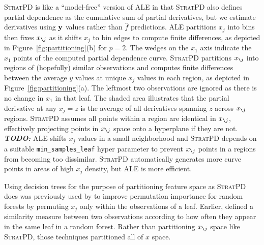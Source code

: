 \documentclass{article}
\newcommand{\figref}[1]{Figure~\ref{#1}}
\newcommand{\cut}[1]{}
\newcommand{\todo}[1]{{\bf\em TODO:} {{\color{red}{#1}}}}
\newcommand{\spd}{\fontfamily{cmr}\textsc{\small StratPD}}
\newcommand{\xnj}{$x_{\texttt{\char`\\} j}$}
\renewcommand{\slash}{\texttt{\char`\\}}
\DeclareMathOperator{\Ex}{\mathbb{E}}
\begin{document}
\spd{} is like a ``model-free'' version of ALE in that \spd{} also defines partial dependence as the cumulative sum of partial derivatives, but we estimate derivatives using $\bf y$ values rather than $\hat{f}$ predictions. 
ALE partitions $x_j$ into bins then fixes \xnj{} as it shifts $x_j$ to bin edges to compute finite differences, as depicted in \figref{fig:partitioning}(b) for $p=2$. The wedges on the $x_1$ axis indicate the $x_1$ points of the computed partial dependence curve.  \spd{} partitions \xnj{} into regions of (hopefully) similar observations and computes finite differences between the average $y$ values at unique $x_j$ values in each region, as depicted in \figref{fig:partitioning}(a).  The leftmost two observations are ignored as there is no change in $x_1$ in that leaf. The shaded area illustrates that the partial derivative at any $x_j=z$ is the average of all derivatives spanning $z$ across \xnj{} regions.  \spd{} assumes all points within a region are identical in \xnj{}, effectively projecting points in \xnj{} space onto a hyperplane if they are not. \todo{sound right James?}  ALE shifts $x_j$ values in a small neighborhood and \spd{} depends on a suitable {\tt\small min\_samples\_leaf}  hyper parameter to prevent \xnj{} points in a regions from becoming too dissimilar.  \spd{} automatically generates more curve points in areas of high $x_j$ density, but ALE is more efficient.

Using decision trees for the purpose of partitioning feature space as \spd{} does was previously used by \cite{rfimp} to improve permutation importance for random forests by permuting $x_j$ only within the observations of a leaf. Earlier, \cite{RFunsup} defined a similarity measure between two observations according to how often they appear in the same leaf in a random forest.  Rather than partitioning  \xnj{} space like \spd, those techniques partitioned all of $x$ space.

\cut{
\begin{equation}
g_{j,ALE}(z) = \int_{\text{min}({\bf X}_j)}^{z} \Ex[ f^j(x_j,{\bf X}_{\slash j}) \,|\, x_j = z ] dx_j
\end{equation}
}

\end{document}

